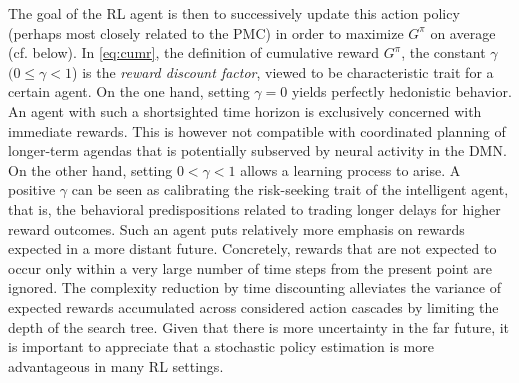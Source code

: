 \documentclass[10pt,letterpaper]{article}
\begin{document}
The goal of the RL agent is then to successively update this action policy
(perhaps most closely related to the PMC) in order
to maximize $G^\pi$ on average (cf. below). In \eqref{eq:cumr},
the definition of cumulative reward $G^\pi$,
the constant $\gamma$ $(0 \le \gamma < 1$) is the \textit{reward discount factor},
viewed to be characteristic trait for a certain agent.
On the one hand,
setting $\gamma = 0$ yields perfectly hedonistic behavior.
An agent with such a shortsighted time horizon is exclusively
concerned with immediate rewards.
This is however not compatible with coordinated planning of longer-term agendas that is
potentially subserved by neural activity in the DMN.
On the other hand,
setting $0 < \gamma < 1$ allows a learning process to arise.
A positive $\gamma$ can be seen as calibrating the risk-seeking trait of the intelligent agent,
that is, the behavioral predispositions related to trading longer delays
for higher reward outcomes.
Such an agent puts relatively more emphasis on rewards expected in
a more distant future.
Concretely,
rewards that are not expected to occur only within
a very large number of
time steps from the present point are ignored.
The complexity reduction by time discounting
alleviates the variance of expected rewards accumulated across
considered action cascades by limiting the depth of the search tree.
Given that there is more uncertainty in the far future,
it is important to appreciate that a stochastic policy estimation
is more advantageous in many RL settings.
\end{document}
